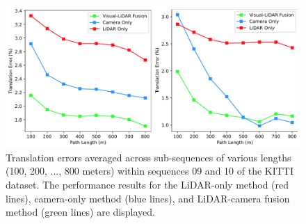 \begin{figure}[t]
\centering
\includegraphics[width=\columnwidth]{Reports/3-Analysis-of-Baselines/images/HVLO-ablations.png}
\caption{
    Translation errors averaged across sub-sequences of various lengths (100, 200, ..., 800 meters) within sequences 09 and 10 of the KITTI dataset. The performance results for the LiDAR-only method (red lines), camera-only method (blue lines), and LiDAR-camera fusion method (green lines) are displayed.
}
\vspace{-0.4cm}
\label{fig:multimodal-plot}
\end{figure}